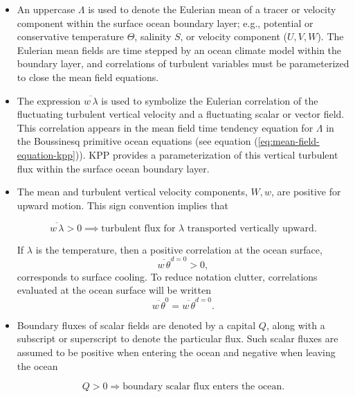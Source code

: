 \begin{itemize}
\item \label{Lambda_defined} An uppercase $\Lambda$ is used to denote
  the Eulerian mean of a tracer or velocity component within the
  surface ocean boundary layer; e.g., potential or conservative
  temperature $\Theta$, salinity $S$, or velocity component ($U,V,W$).
  The Eulerian mean fields are time stepped by an ocean climate model
  within the boundary layer, and correlations of turbulent variables
  must be parameterized to close the mean field equations.

\item \label{correlation_defined} The expression $\overline{w \,
    \lambda}$ is used to symbolize the Eulerian correlation of the
  fluctuating turbulent vertical velocity and a fluctuating scalar or
  vector field. This correlation appears in the mean field time
  tendency equation for $\Lambda$ in the Boussinesq primitive ocean
  equations (see equation (\ref{eq:mean-field-equation-kpp})). KPP
  provides a parameterization of this vertical turbulent flux within
  the surface ocean boundary layer.

\item \label{w_W_defined} The mean and turbulent vertical velocity
  components, $W,w$, are positive for upward motion. This sign
  convention implies that
\begin{mdframed}[backgroundcolor=lightgray!50]
   \begin{equation}
  \overline{w \, \lambda}  > 0  \implies \mbox{turbulent flux for $\lambda$ transported vertically upward}.
\label{eq:correlation-convention}
\end{equation}
\end{mdframed}
If $\lambda$ is the temperature, then a positive correlation at the
ocean surface, 
\begin{equation}
 \overline{w \, \theta}^{d=0} > 0,
\end{equation}
corresponds to surface cooling.  To reduce notation clutter,
correlations evaluated at the ocean surface will be written
\begin{equation}
 \overline{w \, \theta}^{0} =  \overline{w \, \theta}^{d=0}.
\end{equation}

\item Boundary fluxes of scalar fields are denoted by a capital $Q$,
  along with a subscript or superscript to denote the particular flux.
  Such scalar fluxes are assumed to be positive when entering the
  ocean and negative when leaving the ocean
\begin{mdframed}[backgroundcolor=lightgray!50]
\begin{equation}
  Q > 0 \Rightarrow \mbox{boundary scalar flux enters the ocean.} 
\label{eq:boundary-sign-convention}
\end{equation}
\end{mdframed}



\end{itemize}

